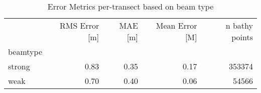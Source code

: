 \begin{table}[htbp]
\centering
\caption{Error Metrics per-transect based on beam type}
\label{tab:error-by-strongweak}
\begin{tabular}{lrrrr}
\toprule
 & RMS Error [m] & MAE [m] & Mean Error [M] & n bathy points \\
beamtype &  &  &  &  \\
\midrule
strong & 0.83 & 0.35 & 0.17 & 353374 \\
weak & 0.70 & 0.40 & 0.06 & 54566 \\
\bottomrule
\end{tabular}
\end{table}
